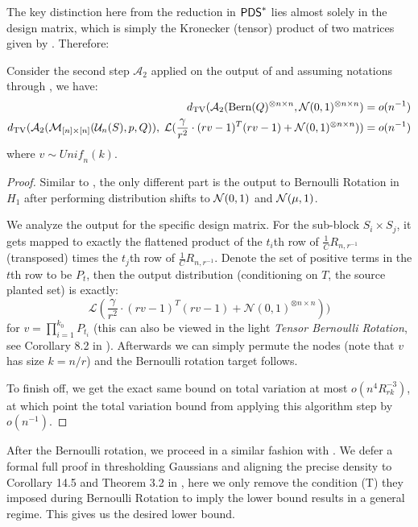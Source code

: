 \documentclass[final,12pt]{colt2023} %
\newcommand\1[1]{\mathbb{I}_{\left\{#1\right\}}}
\begin{document}
The key distinction here from the reduction in $\mathsf{PDS}^*$ lies almost solely in the design matrix, which is simply the Kronecker (tensor) product of two matrices given by . Therefore:
\begin{lemma}
Consider the second step $\mathcal{A}_2$ applied on the output of  and assuming notations through , we have:
\begin{align*}
    d_{\rm TV}(\mathcal{A}_2({\rm Bern}(Q)^{\otimes n\times n}, \mathcal{N}(0,1)^{\otimes n\times n})&=o(n^{-1})\\
    d_{\rm TV}(\mathcal{A}_2(\mathcal{M}_{[n]\times [n]}(\mathcal{U}_n(S), p, Q)),\; \mathcal{L}( \frac{\gamma}{r^2}\cdot (rv-{1})^T(rv-{1})+\mathcal{N}(0, 1)^{\otimes n\times n}))&=o(n^{-1})
\end{align*}
where $v\sim \textit{Unif}_n(k)$.
\end{lemma}

\begin{proof}
Similar to , the only different part is the output to Bernoulli Rotation in $H_1$ after performing distribution shifts to $\mathcal{N}(0, 1)$ and $\mathcal{N}(\mu, 1)$.

\spac We analyze the output for the specific design matrix. For the sub-block $S_i\times S_j$, it gets mapped to exactly the flattened product of the $t_i$th row of $\frac{1}{C}R_{n, r^{-1}}$ (transposed) times the $t_j$th row of $\frac{1}{C}R_{n, r^{-1}}$. Denote the set of positive terms in the $t$th row to be $P_t$, then the output distribution (conditioning on $T$, the source planted set) is exactly:
$$\mathcal{L}(\frac{\gamma}{r^2}\cdot (rv-{1})^T(rv-{1})+\mathcal{N}(0, 1)^{\otimes n\times n}))$$for $v=\prod_{i=1}^{k_0} P_{t_i}$ (this can also be viewed in the light \emph{Tensor Bernoulli Rotation}, see Corollary 8.2 in \cite{BB20}). Afterwards we can simply permute the nodes (note that $v$ has size $k=n/r$) and the Bernoulli rotation target follows.

\spac To finish off, we get the exact same bound on total variation at most $o(n^4R_{rk}^{-3})$, at which point the total variation bound from applying this algorithm step by $o(n^{-1})$.
\end{proof}
After the Bernoulli rotation, we proceed in a similar fashion with . We defer a formal full proof in thresholding Gaussians and aligning the precise density to Corollary 14.5 and Theorem 3.2 in \cite{BB20}, here we only remove the condition (\textsc{T}) they imposed during Bernoulli Rotation to imply the lower bound results in a general regime. This gives us the desired lower bound.
\end{document}
